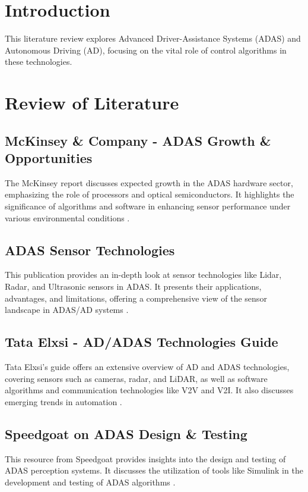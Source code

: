 \documentclass[12pt]{report}
\begin{document}


\chapter{Introduction}
This literature review explores Advanced Driver-Assistance Systems (ADAS) and Autonomous Driving (AD), focusing on the vital role of control algorithms in these technologies.

\chapter{Review of Literature}

\section{McKinsey \& Company - ADAS Growth \& Opportunities}
The McKinsey report discusses expected growth in the ADAS hardware sector, emphasizing the role of processors and optical semiconductors. It highlights the significance of algorithms and software in enhancing sensor performance under various environmental conditions \citep{mckinsey2024}.

\section{ADAS Sensor Technologies}
This publication provides an in-depth look at sensor technologies like Lidar, Radar, and Ultrasonic sensors in ADAS. It presents their applications, advantages, and limitations, offering a comprehensive view of the sensor landscape in ADAS/AD systems \citep{sensorTech2024}.

\section{Tata Elxsi - AD/ADAS Technologies Guide}
Tata Elxsi's guide offers an extensive overview of AD and ADAS technologies, covering sensors such as cameras, radar, and LiDAR, as well as software algorithms and communication technologies like V2V and V2I. It also discusses emerging trends in automation \citep{tataElxsi2024}.

\section{Speedgoat on ADAS Design \& Testing}
This resource from Speedgoat provides insights into the design and testing of ADAS perception systems. It discusses the utilization of tools like Simulink in the development and testing of ADAS algorithms \citep{speedgoat2024}.
\end{document}
